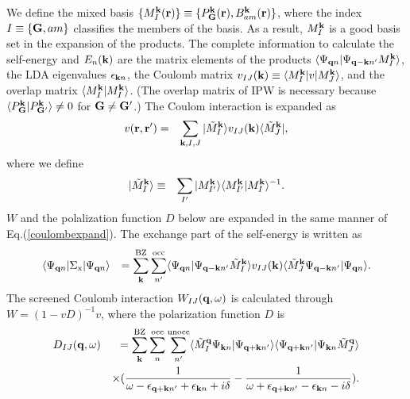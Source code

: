 \documentclass[a4paper,10pt,epsf,fleqn]{article}
\begin{document}
We define the mixed basis
$\{M^{\bf k}_I({\bf r}) \}\equiv \{ P^{\bf k}_{\bf G}({\bf r}), B_{am}^{\bf k}({\bf r})\}$,
where the index $I\equiv \{ {\bf G},am\}$ classifies the members of the basis.
As a result, $M^{\bf k}_I$ is a good basis set in the expansion of the products.
The complete information to calculate the self-energy and $E_n({\bf k})$ are
the matrix elements of the products $\langle \Psi_{{\bf q}n}| \Psi_{{\bf q-k}n'} M^{\bf k}_I \rangle$,
the LDA eigenvalues $\epsilon_{{\bf k}n}$, 
the Coulomb matrix $v_{IJ}({\bf k})
\equiv \langle M^{\bf k}_{I} |v|  M^{\bf k}_{J} \rangle$, 
and the overlap matrix $\langle M^{\bf k}_I |  M^{\bf k}_{I} \rangle$.
(The overlap matrix of IPW is necessary because
 $\langle P^{\bf k}_{\bf G} |  P^{\bf k}_{\bf G'} \rangle \ne 0$
for ${\bf G} \ne {\bf G}'$.)
The Coulom interaction is expanded as
\begin{eqnarray}
\label{coulombexpand}
v({\bf r},{\bf r}') &=& 
\sum_{{\bf k},I,J} |\tilde{M}^{\bf k}_I \rangle
v_{IJ}({\bf k}) \langle \tilde{M}^{\bf k}_J|,
\end{eqnarray}
where we define
\begin{eqnarray}
|\tilde{M}^{\bf k}_{I} \rangle &\equiv& \sum_{I'}
|M^{\bf k}_{I'} \rangle \langle M^{\bf k}_{I'} |  M^{\bf k}_I \rangle^{-1}.
\end{eqnarray}
$W$ and the polalization function $D$ below are expanded
in the same manner of Eq.(\ref{coulombexpand}).
The exchange part of the self-energy is written as
\begin{eqnarray}
\langle \Psi_{{\bf q}n}|\Sigma_{\rm x} |\Psi_{{\bf q}n} \rangle
&&=\sum^{\rm BZ}_{{\bf k}}  \sum^{\rm  occ}_{n'}
\langle \Psi_{{\bf q}n}| \Psi_{{\bf q-k}n'} \tilde{M}^{\bf k}_I \rangle 
v_{IJ}({\bf k})
\langle \tilde{M}^{\bf k}_J \Psi_{{\bf q-k}n'} | \Psi_{{\bf q}n} \rangle. \label{sx}
\end{eqnarray}
The screened Coulomb interaction $W_{IJ}({\bf q},\omega)$ is calculated
through $W = (1-v D)^{-1} v$, where the polarization function $D$ is
\begin{eqnarray}
D_{IJ}({\bf q},\omega)
&&=\sum^{\rm BZ}_{{\bf k}}  \sum^{\rm  occ}_{n} \sum^{\rm  unocc}_{n'}
\langle \tilde{M}^{\bf q}_I \Psi_{{\bf k}n} |\Psi_{{\bf q+k}n'} \rangle
\langle \Psi_{{\bf q+k}n'}| \Psi_{{\bf k}n} \tilde{M}^{\bf q}_J \rangle \nonumber \\
&& \times
(\frac{1}{\omega-\epsilon_{{\bf q+k}n'}+\epsilon_{{\bf k}n}+i \delta}
-\frac{1}{\omega+\epsilon_{{\bf q+k}n'}-\epsilon_{{\bf k}n}-i \delta}). \label{dieele}
\end{eqnarray}
\end{document}
